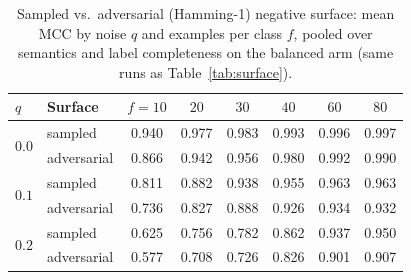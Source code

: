 \documentclass[review,12pt]{elsarticle}
\theoremstyle{definition}
\theoremstyle{remark}
\begin{document}
\begin{table}[t]
\centering\small
\caption{Sampled vs.\ adversarial (Hamming-1) negative surface: mean MCC by
noise $q$ and examples per class $f$, pooled over semantics and label
completeness on the balanced arm (same runs as Table~\ref{tab:surface}).}
\label{tab:hardsurface}
\begin{tabular}{llcccccc}
\toprule
$q$ & Surface & $f{=}10$ & $20$ & $30$ & $40$ & $60$ & $80$\\
\midrule
\multirow{2}{*}{$0.0$} & sampled     & 0.940 & 0.977 & 0.983 & 0.993 & 0.996 & 0.997\\
                       & adversarial & 0.866 & 0.942 & 0.956 & 0.980 & 0.992 & 0.990\\
\midrule
\multirow{2}{*}{$0.1$} & sampled     & 0.811 & 0.882 & 0.938 & 0.955 & 0.963 & 0.963\\
                       & adversarial & 0.736 & 0.827 & 0.888 & 0.926 & 0.934 & 0.932\\
\midrule
\multirow{2}{*}{$0.2$} & sampled     & 0.625 & 0.756 & 0.782 & 0.862 & 0.937 & 0.950\\
                       & adversarial & 0.577 & 0.708 & 0.726 & 0.826 & 0.901 & 0.907\\
\bottomrule
\end{tabular}
\end{table}
\end{document}
